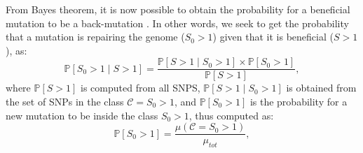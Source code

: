 \documentclass{article}
\newcommand{\proba}{\mathbb{P}}
\newcommand{\Sphy}{S_{0}}
\newcommand{\Sphyclass}{\mathcal{C}}
\newcommand{\divAdv}{ \Sphy > 1}
\newcommand{\given}{\mid}
\newcommand{\Spop}{S}
\newcommand{\polyAdv}{ \Spop > 1}
\newcommand{\PpolyAdv}{\proba \left[ \polyAdv \right]}
\begin{document}
    From Bayes theorem, it is now possible to obtain the probability for a beneficial mutation to be a back-mutation .
    In other words, we seek to get the probability that a mutation is repairing the genome ($\divAdv$) given that it is beneficial ($\polyAdv$), as:
    \begin{equation}
        \proba \left[\divAdv \given \polyAdv\right] = \frac{\proba \left[\polyAdv \given \divAdv\right] \times \proba\left[\divAdv\right]}{\PpolyAdv},
        \label{eq:bayes}
    \end{equation}
    where $\PpolyAdv$ is computed from all SNPS, $\proba \left[\polyAdv \given \divAdv\right]$ is obtained from the set of SNPs in the class $\Sphyclass = \divAdv$, and $\proba\left[\divAdv\right]$ is the probability for a new mutation to be inside the class $\divAdv$, thus computed as:
    \begin{equation}
        \proba\left[\divAdv\right] = \frac{\mu\left( \Sphyclass = \divAdv \right)}{\mu_{tot}},
        \label{eq:proba-dfe-mutsel}
    \end{equation}
\end{document}
